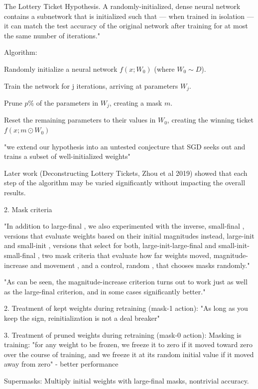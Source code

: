 \documentclass[english]{article}
\begin{document}
The Lottery Ticket Hypothesis. A randomly-initialized, dense neural network contains a subnetwork that is initialized such that — when trained in isolation — it can match the test accuracy of the
original network after training for at most the same number of iterations."

Algorithm: 

\benum
\item  Randomly initialize a neural network $f(x;W_0)$ (where $W_0 \sim D$).
\item  Train the network for j iterations, arriving at parameters $W_j$.
\item  Prune $p$\% of the parameters in $W_j$, creating a mask $m$.
\item  Reset the remaining parameters to their values in $W_0$, creating the winning ticket $f(x;m\odot W_0)$
\eenum 

"we extend our hypothesis
into an untested conjecture that SGD seeks out and trains a subset of well-initialized weights"

\item Later work (Deconstructing Lottery Tickets, Zhou et al 2019) showed that each step of the algorithm may be varied significantly without impacting the overall results.

2. Mask criteria

"In addition to large-final , we also experimented with the inverse, small-final , versions that evaluate
weights based on their initial magnitudes instead, large-init and small-init , versions that select
for both, large-init-large-final and small-init-small-final , two mask criteria that evaluate how far
weights moved, magnitude-increase and movement , and a control, random , that chooses masks
randomly."

"As can be seen, the
magnitude-increase criterion turns out to work just as well as the large-final criterion, and in some
cases significantly better."

2. Treatment of kept weights during retraining (mask-1 action): "As long as you keep the sign, reinitialization is not a deal breaker"

3. Treatment of pruned weights during
retraining (mask-0 action): Masking is training: "for any weight to be frozen, we freeze it to zero if it moved
toward zero over the course of training, and we freeze it at its random initial value if it moved away from zero" - better performance

Supermasks: Multiply initial weights with large-final masks, nontrivial accuracy. 
\end{document}
